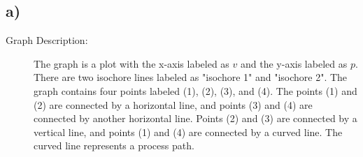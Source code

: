 

\subsection*{a)}

\begin{description}
    \item[Graph Description:] The graph is a plot with the x-axis labeled as $v$ and the y-axis labeled as $p$. There are two isochore lines labeled as "isochore 1" and "isochore 2". The graph contains four points labeled (1), (2), (3), and (4). The points (1) and (2) are connected by a horizontal line, and points (3) and (4) are connected by another horizontal line. Points (2) and (3) are connected by a vertical line, and points (1) and (4) are connected by a curved line. The curved line represents a process path.
\end{description}